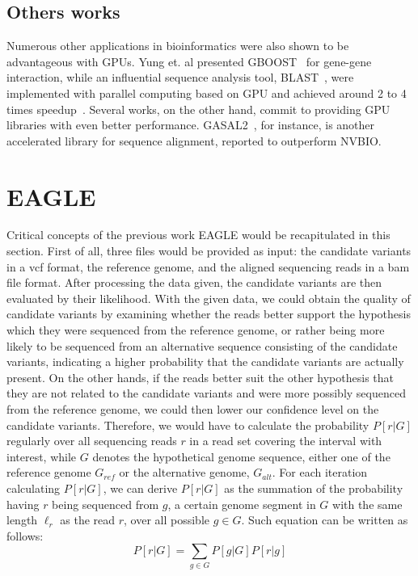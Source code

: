 \documentclass{PHlab-thesis}
\begin{document}
\subsection{Others works}
Numerous other applications in bioinformatics were also shown to be advantageous with GPUs. Yung et. al presented GBOOST~\cite{yung2011gboost} for gene-gene interaction, while an influential sequence analysis tool, BLAST~\cite{altschul1990basic}, were implemented with parallel computing based on GPU and achieved around 2 to 4 times speedup~\cite{vouzis2011gpu}. Several works, on the other hand, commit to providing GPU libraries with even better performance. GASAL2~\cite{ahmed2019gasal2}, for instance, is another accelerated library for sequence alignment, reported to outperform NVBIO. 

\section{EAGLE}
Critical concepts of the previous work EAGLE would be recapitulated in this section. First of all, three files would be provided as input: the candidate variants in a vcf format, the reference genome, and the aligned sequencing reads in a bam file format. After processing the data given, the candidate variants are then evaluated by their likelihood. With the given data, we could obtain the quality of candidate variants by examining whether the reads better support the hypothesis which they were sequenced from the reference genome, or rather being more likely to be sequenced from an alternative sequence consisting of the candidate variants, indicating a higher probability that the candidate variants are actually present. On the other hands, if the reads better suit the other hypothesis that they are not related to the candidate variants and were more possibly sequenced from the reference genome, we could then lower our confidence level on the candidate variants. Therefore, we would have to calculate the probability $P[r|G]$ regularly over all sequencing reads $r$ in a read set covering the interval with interest, while $G$ denotes the hypothetical genome sequence, either one of the reference genome $G_{ref}$ or the alternative genome, $G_{alt}$. For each iteration calculating $P[r|G]$, we can derive $P[r|G]$ as the summation of the probability having $r$ being sequenced from $g$, a certain genome segment in $G$ with the same length $\ell_r$ as the read $r$, over all possible ${g\in G}$. Such equation can be written as follows:
\begin{equation}
P[r|G] = \sum_{g\in G} P[g|G] P[r|g]
\end{equation}
\end{document}
